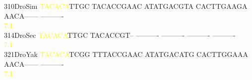 \documentclass[11pt,twoside,reqno,a4paper]{article}
\begin{document}
{310\hspace*{2\charwidth}DroSim	\textcolor{yellow}{T}\textcolor{yellow}{A}\textcolor{yellow}{C}\textcolor{yellow}{A}\textcolor{yellow}{C}\textcolor{yellow}{A}TTGC	TACACCGAAC	ATATGACGTA	CACTTGAAGA	AACA------	----------	\\
\hspace*{5\charwidth}\hspace*{7\charwidth}\hspace*{0\charwidth}\textcolor{yellow}{7.1}\hspace*{1\charwidth}\hspace*{1\charwidth}\hspace*{1\charwidth}\hspace*{1\charwidth}\hspace*{1\charwidth}\hspace*{1\charwidth}\\
314\hspace*{2\charwidth}DroSec	\textcolor{yellow}{T}\textcolor{yellow}{A}\textcolor{yellow}{C}\textcolor{yellow}{A}\textcolor{yellow}{C}\textcolor{yellow}{A}TTGC	TACACCGT--	----------	----------	----------	----------	\\
\hspace*{5\charwidth}\hspace*{7\charwidth}\hspace*{0\charwidth}\textcolor{yellow}{7.1}\hspace*{1\charwidth}\hspace*{1\charwidth}\hspace*{1\charwidth}\hspace*{1\charwidth}\hspace*{1\charwidth}\hspace*{1\charwidth}\\
321\hspace*{2\charwidth}DroYak	\textcolor{yellow}{T}\textcolor{yellow}{A}\textcolor{yellow}{C}\textcolor{yellow}{A}\textcolor{yellow}{C}\textcolor{yellow}{A}TCGG	TTTACCGAAC	ATATGACATG	CACTTGGAAA	AACA------	----------	\\
\hspace*{5\charwidth}\hspace*{7\charwidth}\hspace*{0\charwidth}\textcolor{yellow}{7.1}\hspace*{1\charwidth}\hspace*{1\charwidth}\hspace*{1\charwidth}\hspace*{1\charwidth}\hspace*{1\charwidth}\hspace*{1\charwidth}\\
}
\end{document}
